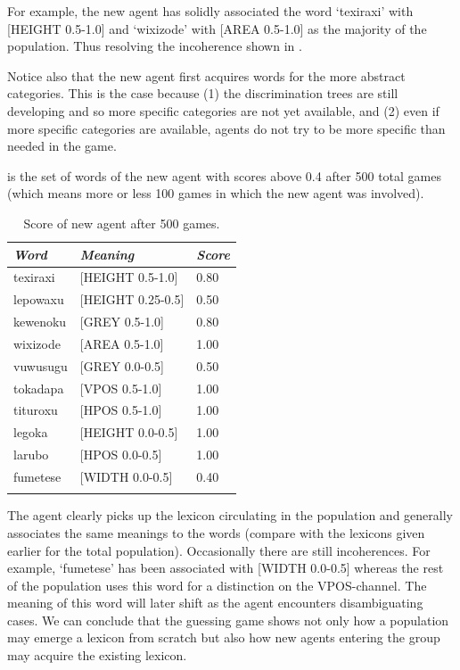 For example, the new agent
has solidly associated the word `texiraxi' with 
{}[HEIGHT 0.5-1.0] and `wixizode' with [AREA 0.5-1.0]
as the majority of the population. Thus resolving the 
incoherence shown in . 

Notice also that the new agent first acquires words 
for the more abstract categories. This is the case 
because (1) the discrimination trees are still developing
and so more specific categories are not yet available, 
and (2) even if more specific categories are available, 
agents do not try to be more specific than needed in 
the game. 

 is the set of words of the new agent
with scores above 0.4 after 
500 total games (which means more or less 100 games 
in which the new agent was involved). 


\begin{table}
\begin{center}
\begin{tabular}{ l  l  l }
\lsptoprule
{\itshape Word} & {\itshape Meaning} & {\itshape Score} \\ \midrule
texiraxi &  [HEIGHT 0.5-1.0] & 0.80 \\ 
lepowaxu &  [HEIGHT 0.25-0.5] & 0.50 \\ 
kewenoku &  [GREY 0.5-1.0] & 0.80 \\ 
wixizode & [AREA 0.5-1.0] & 1.00 \\ 
vuwusugu & [GREY 0.0-0.5] & 0.50 \\ 
tokadapa &  [VPOS 0.5-1.0] & 1.00 \\ 
tituroxu &  [HPOS 0.5-1.0] & 1.00 \\ 
legoka   &  [HEIGHT 0.0-0.5] & 1.00 \\ 
larubo   &  [HPOS 0.0-0.5] & 1.00 \\ 
fumetese &  [WIDTH 0.0-0.5] & 0.40 \\ 
\lspbottomrule
\end{tabular}
\caption{\label{tab:newagents} Score of new agent after 500 games.}
\end{center}
\end{table}
The agent clearly picks up the lexicon circulating
in the population and generally associates the 
same meanings to the words (compare with the 
lexicons given earlier for the total population). 
Occasionally there are still incoherences. For example, 
`fumetese' has been associated with [WIDTH 0.0-0.5] 
whereas the rest of the population uses this word
for a distinction on the VPOS-channel. The meaning
of this word will later shift as the agent encounters
disambiguating cases. We can conclude that the 
guessing game shows not only how a population may 
emerge a lexicon from scratch but also how new 
agents entering the group may acquire the existing 
lexicon.  

